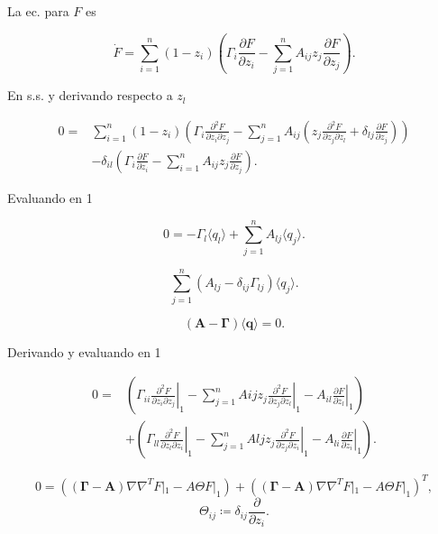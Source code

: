 \documentclass[10pt]{beamer}
\begin{document}
\begin{frame}
La ec. para $F$ es

$$\dot{F} = \sum_{i=1}^n(1-z_i)\left(\Gamma_i\frac{\partial F}{\partial z_i} - \sum_{j=1}^n A_{ij}z_j\frac{\partial F}{\partial z_j} \right).$$

En s.s. y derivando respecto a $z_l$

\begin{align*}
0 =& \sum_{i=1}^n (1-z_i)\left(\Gamma_i\frac{\partial^2F}{\partial z_i \partial z_j} - \sum_{j=1}^nA_{ij}\left( z_j\frac{\partial^2F}{\partial z_j\partial z_l} + \delta_{lj}\frac{\partial F}{\partial z_j} \right) \right) \\
&-\delta_{il}\left(\Gamma_i \frac{\partial F}{\partial z_i} - \sum_{i=1}^nA_{ij}z_j\frac{\partial F}{\partial z_j} \right).
\end{align*}

Evaluando en 1

$$0 = -\Gamma_l \langle q_l \rangle + \sum_{j=1}^nA_{lj}\langle q_j \rangle. $$

\end{frame}
\begin{frame}

$$\sum_{j=1}^n\left( A_{lj} - \delta_{ij}\Gamma_{lj}\right) \langle q_j \rangle.$$

$$\left(\mathbf{A} - \mathbf{\Gamma}\right)\langle \mathbf{q} \rangle = 0.$$

Derivando y evaluando en 1

\begin{align*}
0 =& \left(\Gamma_{ii}\left. \frac{\partial^2F}{\partial z_i \partial z_j}\right|_1 - \sum_{j=1}^nA{ij}z_j\left.\frac{\partial^2 F}{\partial z_j\partial z_l} \right|_1 - A_{il}\left.\frac{\partial F}{\partial z_l}\right|_1\right)\\
&+ \left(\Gamma_{ll}\left. \frac{\partial^2F}{\partial z_l \partial z_i}\right|_1 - \sum_{j=1}^nA{lj}z_j\left.\frac{\partial^2 F}{\partial z_j\partial z_i} \right|_1 - A_{li}\left.\frac{\partial F}{\partial z_i}\right|_1\right).
\end{align*}

$$0 = \left( \left( \mathbf{\Gamma} - \mathbf{A}\right) \nabla\nabla^TF|_1 - A\Theta F|_1 \right) +  \left( \left( \mathbf{\Gamma} - \mathbf{A}\right) \nabla\nabla^TF|_1 - A\Theta F|_1\right)^T,$$ 
$$\Theta_{ij} \coloneqq \delta_{ij}\frac{\partial}{\partial z_i}.$$

\end{frame}
\end{document}
